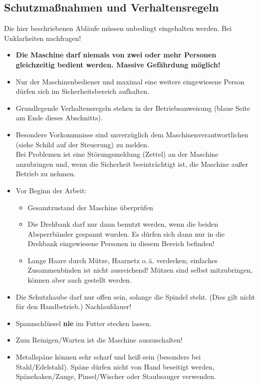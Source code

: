 \documentclass{\basedir/fablab-document}
\begin{document}
\subsection{Schutzmaßnahmen und Verhaltensregeln}
Die hier beschriebenen Abläufe müssen unbedingt eingehalten werden. Bei Unklarheiten nachfragen!
\begin{itemize}
\item \textbf{Die Maschine darf niemals von zwei oder mehr Personen gleichzeitig bedient werden. Massive Gefährdung möglich!}
\item Nur der Maschinenbediener und maximal eine weitere eingewiesene Person dürfen sich im Sicherheitsbereich aufhalten.\\
\item Grundlegende Verhaltensregeln stehen in der Betriebsanweisung (blaue Seite am Ende dieses Abschnitts).
\item Besondere Vorkommnisse sind unverzüglich dem Maschinenverantwortlichen (siehe Schild auf der Steuerung) zu melden.\\
Bei Problemen ist eine Störungsmeldung (Zettel) an der Maschine anzubringen und, wenn die Sicherheit beeinträchtigt ist, die Maschine außer Betrieb zu nehmen.

\item Vor Beginn der Arbeit:
\begin{itemize}
\item Gesamtzustand der Maschine überprüfen
\item Die Drehbank darf nur dann benutzt werden, wenn die beiden Absperrbänder gespannt wurden. Es dürfen sich dann nur in die Drehbank eingewiesene Personen in diesem Bereich befinden!
\item Lange Haare durch Mütze, Haarnetz o.\,ä. verdecken; einfaches Zusammenbinden ist nicht ausreichend! Mützen sind selbst mitzubringen, können aber auch gestellt werden.
\end{itemize}

 \item Die Schutzhaube darf nur offen sein, solange die Spindel steht. (Dies gilt nicht für den Handbetrieb.) Nachlaufdauer!  %
 \item Spannschlüssel \textbf{nie} im Futter stecken lassen. %
 \item Zum Reinigen/Warten ist die Maschine auszuschalten!
 \item Metallspäne können sehr scharf und heiß sein (besonders bei Stahl/Edelstahl). Späne dürfen nicht von Hand beseitigt werden, Spänehaken/Zange, Pinsel/Wischer oder Staubsauger verwenden. %


\end{itemize}
\end{document}
